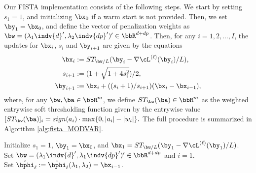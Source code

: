 Our FISTA implementation consists of the following steps. We start by setting $s_1 = 1$, and initializing $\bx_0$ if a warm start is not provided. Then, we set $\by_1 = \bx_0$, and define the vector of penalization weights as $\bw = (\lambda_1 \indv{d}', \lambda_2 \indv{dp}')' \in \bbR^{d+dp}$. Then, for any $i=1,2,\ldots, I$, the updates for $\bx_i$, $s_i$ and $\by_{i+1}$ are given by the equations
\begin{align*}
	\bx_{i} &:= ST_{\bw/L}( \by_i - \nabla \cL^{(\ell)}(\by_i) / L),\\
	s_{i + 1} &:= (1+\sqrt{1 + 4 s_{i}^{2}})/2,\\
	\by_{i + 1} &:= \bx_i + ((s_i + 1)/s_{i+1}) (\bx_i - \bx_{i - 1}),
\end{align*}
where, for any $\bw,\ba\in\bbR^{m}$, we define $ST_{\bw}(\ba)\in\bbR^{m}$ as the weighted entrywise soft thresholding function given by the entrywise value $[ST_{\bw}(\ba)]_i = sign(a_i) \cdot \max\{ 0, |a_i| - |w_i| \}.$ The full procedure is summarized in Algorithm \ref{alg:fista_MODVAR}. 




\begin{singlespace}
	\begin{algorithm}
		\SetAlgoLined
		Initialize $s_1 = 1$, $\by_1= \bx_0 $, and $\bx_1 =  ST_{\bw/L}( \by_1 - \nabla \cL^{(\ell)}(\by_1) / L)$.\\
		Set $\bw = (\lambda_1 \indv{d}', \lambda_1 \indv{dp}')' \in \bbR^{d+dp}$ and $i = 1$.\\
		Set $\hat\bphi_\ell := \hat\bphi_\ell(\lambda_1,\lambda_2) = \bx_{i-1}$.\\
		\caption{FISTA for $\ell$-step of MOD-VAR estimation.}\label{alg:fista_MODVAR}
	\end{algorithm}
\end{singlespace}%


